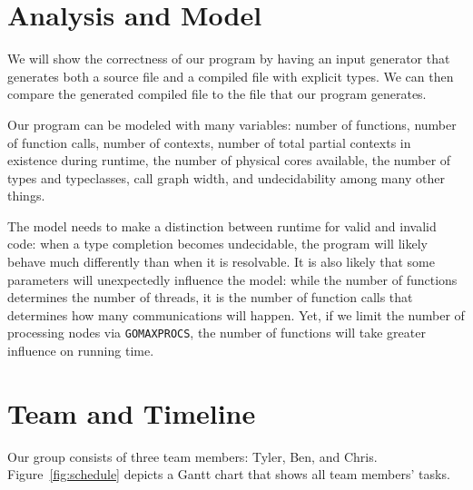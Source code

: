 \documentclass{acm_proc_article-sp}
\begin{document}
\section{Analysis and Model}

We will show the correctness of our program by having an input generator that
generates both a source file and a compiled file with explicit types. We can
then compare the generated compiled file to the file that our program
generates. 

Our program can be modeled with many variables: number of functions, number of
function calls, number of contexts, number of total partial contexts in
existence during runtime, the number of physical cores available, the number of
types and typeclasses, call graph width, and undecidability among many other
things.

The model needs to make a distinction between runtime for valid and invalid
code: when a type completion becomes undecidable, the program will likely
behave much differently than when it is resolvable. It is also likely that some
parameters will unexpectedly influence the model: while the number of functions
determines the number of threads, it is the number of function calls that
determines how many communications will happen. Yet, if we limit the number of
processing nodes via \texttt{GOMAXPROCS}, the number of functions will take
greater influence on running time.



\section{Team and Timeline}

Our group consists of three team members: Tyler, Ben, and Chris.
Figure~\ref{fig:schedule} depicts a Gantt chart
that shows all team members' tasks.
\end{document}
